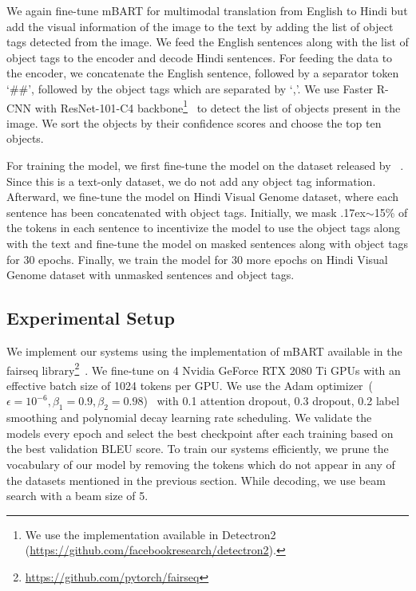 \documentclass[11pt,a4paper]{article}
\newcommand{\approximately}{{\raise.17ex\hbox{$\scriptstyle\sim$}}}
\begin{document}
We again fine-tune mBART for multimodal translation from English to Hindi but add the visual information of the image to the text by adding the list of object tags detected from the image.
We feed the English sentences along with the list of object tags to the encoder and decode Hindi sentences. For feeding the data to the encoder, we concatenate the English sentence, followed by a separator token `\#\#', followed by the object tags which are separated by `,'.  We use Faster R-CNN with ResNet-101-C4 backbone\footnote{We use the implementation available in Detectron2 (\url{https://github.com/facebookresearch/detectron2}).}~\citep{DBLP:conf/nips/RenHGS15} to detect the list of objects present in the image. We sort the objects by their confidence scores and choose the top ten objects.

For training the model, we first fine-tune the model on the dataset released by ~\citet{kunchukuttan-etal-2018-iit}. Since this is a text-only dataset, we do not add any object tag information. Afterward, we fine-tune the model on Hindi Visual Genome dataset, where each sentence has been concatenated with object tags. Initially, we mask \approximately15\% of the tokens in each sentence to incentivize the model to use the object tags along with the text and fine-tune the model on masked sentences along with object tags for 30 epochs. Finally, we train the model for 30 more epochs on Hindi Visual Genome dataset with unmasked sentences and object tags.


\subsection{Experimental Setup} 



We implement our systems using the implementation of mBART available in the fairseq library\footnote{\url{https://github.com/pytorch/fairseq}}~\citep{ott-etal-2019-fairseq}. We fine-tune on 4 Nvidia GeForce RTX 2080 Ti GPUs with an effective batch size of 1024 tokens per GPU. We use the Adam optimizer~($\epsilon = 10^{-6}, \beta_{1} = 0.9, \beta_{2} = 0.98$)~\citep{adamoptimizer} with 0.1 attention dropout, 0.3 dropout, 0.2 label smoothing and polynomial decay learning rate scheduling. We validate the models every epoch and select the best checkpoint after each training based on the best validation BLEU score. To train our systems efficiently, we prune the vocabulary of our model by removing the tokens which do not appear in any of the datasets mentioned in the previous section. While decoding, we use beam search with a beam size of 5.
\end{document}
